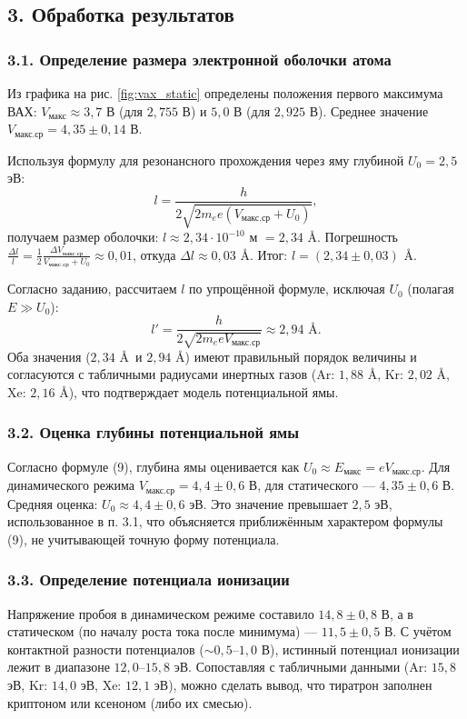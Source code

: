 \documentclass[12pt,a4paper]{article}
\begin{document}
\subsection*{3. Обработка результатов}

\subsubsection*{3.1. Определение размера электронной оболочки атома}
Из графика на рис. \ref{fig:vax_static} определены положения первого максимума ВАХ: $V_{\text{макс}} \approx 3,7$ В (для $2,755$ В) и $5,0$ В (для $2,925$ В). Среднее значение $V_{\text{макс.ср}} = 4,35 \pm 0,14$ В.

Используя формулу для резонансного прохождения через яму глубиной $U_0 = 2,5$ эВ:
\begin{equation}
    l = \frac{h}{2\sqrt{2m_e e (V_{\text{макс.ср}} + U_0)}},
\end{equation}
получаем размер оболочки: $l \approx 2,34 \cdot 10^{-10}$ м $= 2,34$ \AA. 
Погрешность $\frac{\Delta l}{l} = \frac{1}{2} \frac{\Delta V_{\text{макс.ср}}}{V_{\text{макс.ср}} + U_0} \approx 0,01$, откуда $\Delta l \approx 0,03$ \AA. 
Итог: $l = (2,34 \pm 0,03)$ \AA.

Согласно заданию, рассчитаем $l$ по упрощённой формуле, исключая $U_0$ (полагая $E \gg U_0$):
\begin{equation}
    l' = \frac{h}{2\sqrt{2m_e e V_{\text{макс.ср}}}} \approx 2,94 \text{ \AA}.
\end{equation}
Оба значения ($2,34$ \AA\ и $2,94$ \AA) имеют правильный порядок величины и согласуются с табличными радиусами инертных газов (Ar: $1,88$ \AA, Kr: $2,02$ \AA, Xe: $2,16$ \AA), что подтверждает модель потенциальной ямы.

\subsubsection*{3.2. Оценка глубины потенциальной ямы}
Согласно формуле (9), глубина ямы оценивается как $U_0 \approx E_{\text{макс}} = e V_{\text{макс.ср}}$. 
Для динамического режима $V_{\text{макс.ср}} = 4,4 \pm 0,6$ В, для статического --- $4,35 \pm 0,6$ В. 
Средняя оценка: $U_0 \approx 4,4 \pm 0,6$ эВ. Это значение превышает $2,5$ эВ, использованное в п. 3.1, что объясняется приближённым характером формулы (9), не учитывающей точную форму потенциала.

\subsubsection*{3.3. Определение потенциала ионизации}
Напряжение пробоя в динамическом режиме составило $14,8 \pm 0,8$ В, а в статическом (по началу роста тока после минимума) --- $11,5 \pm 0,5$ В. 
С учётом контактной разности потенциалов ($\sim 0,5$--$1,0$ В), истинный потенциал ионизации лежит в диапазоне $12,0$--$15,8$ эВ. Сопоставляя с табличными данными (Ar: $15,8$ эВ, Kr: $14,0$ эВ, Xe: $12,1$ эВ), можно сделать вывод, что тиратрон заполнен криптоном или ксеноном (либо их смесью).
\end{document}
